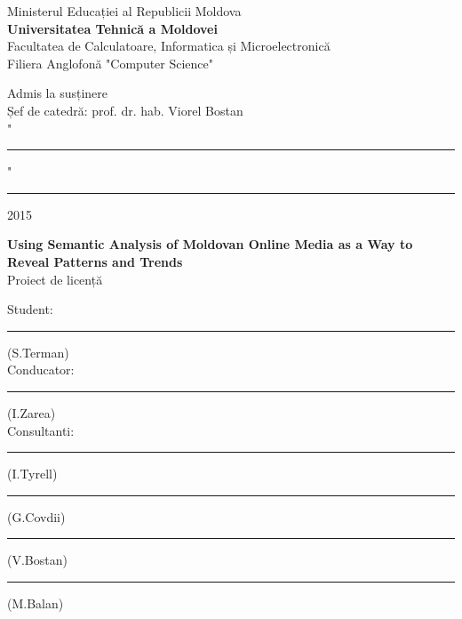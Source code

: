 \begin{titlepage}

\newcommand{\HRule}{\rule{\linewidth}{0.5mm}} %

\center %
 

Ministerul Educației al Republicii Moldova\\ %
\textbf{Universitatea Tehnică a Moldovei}\\%
Facultatea de Calculatoare, Informatica și Microelectronică\\
Filiera Anglofonă "Computer Science"\\


\vspace{2cm}



\hfill Admis la susținere\\
\hfill Șef de catedră: prof. dr. hab. Viorel Bostan\\

\vspace{0.4cm}
\hfill "\rule{0.75cm}{0.2mm}" \ \rule{3cm}{0.2mm} 2015
\vspace{3cm}




\begin{center}
\Large \textbf{Using Semantic Analysis of Moldovan Online Media as a Way to Reveal Patterns and Trends}\\
\vspace{0.6cm}
Proiect de licență
\end{center}
\vspace{1cm}


\hfill Student: \rule{3.9cm}{0.2mm}(S.Terman)\\
\vspace{0.2cm}
\hfill Conducator: \rule{4cm}{0.2mm}(I.Zarea)\\
\vspace{0.2cm}
\hfill Consultanti: \rule{4.2cm}{0.2mm}(I.Tyrell)\\
\vspace{0.2cm}
\hfill \rule{4cm}{0.2mm}(G.Covdii)\\
\vspace{0.2cm}
\hfill \rule{3.9cm}{0.2mm}(V.Bostan)\\
\vspace{0.2cm}
\hfill \rule{4cm}{0.2mm}(M.Balan)\\
\vspace{4cm}




\end{titlepage}
